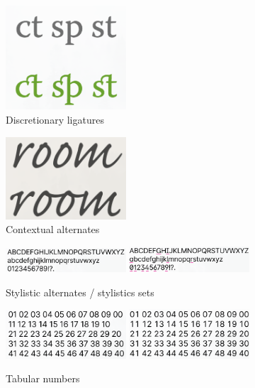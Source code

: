 \documentclass{article}
\begin{document}
\begin{figure}[H]
    \centering
    \includegraphics[width=0.4\textwidth]{img/Screenshot_20200224_095109.png}
    \caption{Discretionary ligatures}
\end{figure}

\begin{figure}[H]
    \centering
    \includegraphics[width=0.4\textwidth]{img/Screenshot_20200224_095132.png}
    \caption{Contextual alternates}
\end{figure}

\begin{figure}[H]
    \centering
    \includegraphics[width=0.4\textwidth]{img/Screenshot_20200224_095438.png}
    \includegraphics[width=0.4\textwidth]{img/Screenshot_20200224_095447.png}
    \caption{Stylistic alternates / stylistics sets}
\end{figure}

\begin{figure}[H]
    \centering
    \includegraphics[width=0.4\textwidth]{img/Screenshot_20200224_095554.png}
    \includegraphics[width=0.4\textwidth]{img/Screenshot_20200224_095602.png}
    \caption{Tabular numbers}
\end{figure}
\end{document}
